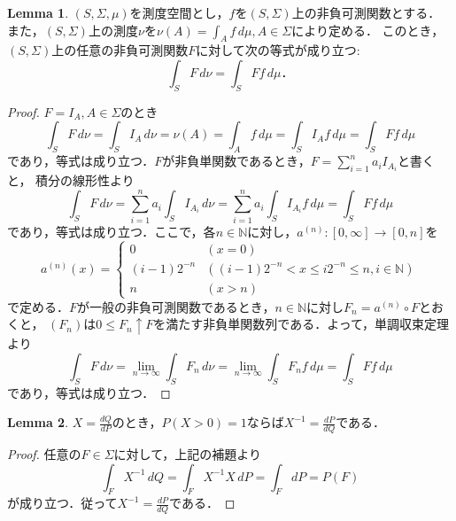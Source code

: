 \documentclass{jsarticle}
\theoremstyle{definition}
\newtheorem{lem}{Lemma}
\begin{document}
\begin{lem}
$(S,\Sigma,\mu)$を測度空間とし，$f$を$(S,\Sigma)$上の非負可測関数とする．
また，$(S,\Sigma)$上の測度$\nu$を$\nu(A)=\int_Af\,d\mu,A\in\Sigma$により定める．
このとき，$(S,\Sigma)$上の任意の非負可測関数$F$に対して次の等式が成り立つ:
\[ \int_SF\,d\nu=\int_SFf\,d\mu．\]
\end{lem}
\begin{proof}
$F=I_A,A\in\Sigma$のとき
\[ \int_SF\,d\nu=\int_SI_A\,d\nu=\nu(A)=\int_Af\,d\mu=\int_SI_Af\,d\mu=\int_SFf\,d\mu \]
であり，等式は成り立つ．$F$が非負単関数であるとき，$F=\sum_{i=1}^na_iI_{A_i}$と書くと，
積分の線形性より
\[
\int_SF\,d\nu=\sum_{i=1}^na_i\int_SI_{A_i}\,d\nu=\sum_{i=1}^na_i\int_SI_{A_i}f\,d\mu
=\int_SFf\,d\mu
\]
であり，等式は成り立つ．ここで，各$n\in\mathbb{N}$に対し，$a^{(n)}\colon[0,\infty]\to[0,n]$を
\[
a^{(n)}(x)=\begin{cases}0 & (x=0) \\
(i-1)2^{-n} & ((i-1)2^{-n}<x\leq i2^{-n}\leq n,i\in\mathbb{N}) \\
n & (x>n)\end{cases}
\]
で定める．$F$が一般の非負可測関数であるとき，$n\in\mathbb{N}$に対し$F_n=a^{(n)}\circ F$とおくと，
$(F_n)$は$0\leq F_n\uparrow F$を満たす非負単関数列である．よって，単調収束定理より
\[
\int_SF\,d\nu=\lim_{n\to\infty}\int_SF_n\,d\nu=\lim_{n\to\infty}\int_SF_nf\,d\mu
=\int_SFf\,d\mu
\]
であり，等式は成り立つ．
\end{proof}
\begin{lem}
$X=\frac{dQ}{dP}$のとき，$P(X>0)=1$ならば$X^{-1}=\frac{dP}{dQ}$である．
\end{lem}
\begin{proof}
任意の$F\in\Sigma$に対して，上記の補題より
\[ \int_FX^{-1}\,dQ=\int_FX^{-1}X\,dP=\int_FdP=P(F) \]
が成り立つ．従って$X^{-1}=\frac{dP}{dQ}$である．
\end{proof}
\end{document}
